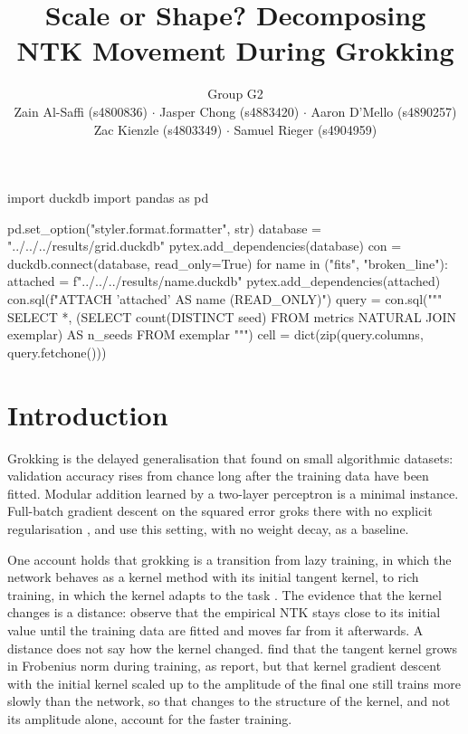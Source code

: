 \documentclass[a4paper,11pt]{article} %
\begin{document}
\begin{pycode}
import duckdb
import pandas as pd

pd.set_option("styler.format.formatter", str)
database = "../../../results/grid.duckdb"
pytex.add_dependencies(database)
con = duckdb.connect(database, read_only=True)
for name in ("fits", "broken_line"):
    attached = f"../../../results/{name}.duckdb"
    pytex.add_dependencies(attached)
    con.sql(f"ATTACH '{attached}' AS {name} (READ_ONLY)")
query = con.sql("""
    SELECT *,
        (SELECT count(DISTINCT seed) FROM metrics NATURAL JOIN exemplar) AS n_seeds
    FROM exemplar
""")
cell = dict(zip(query.columns, query.fetchone()))
\end{pycode}

\title{Scale or Shape? Decomposing NTK Movement During Grokking}
\author{Group G2 \\
  Zain Al-Saffi (s4800836) $\cdot$
  Jasper Chong (s4883420) $\cdot$
  Aaron D'Mello (s4890257) \\
Zac Kienzle (s4803349) $\cdot$ Samuel Rieger (s4904959)}

\date{}
\maketitle

\begin{abstract}
\end{abstract}

\section{Introduction}

Grokking is the delayed generalisation that
\citet{powerGrokkingGeneralizationOverfitting2022} found on small algorithmic
datasets: validation accuracy rises from chance long after the training data
have been fitted. Modular addition learned by a two-layer perceptron is a
minimal instance. Full-batch gradient descent on the squared error groks there
with no explicit regularisation \citep{gromovGrokkingModularArithmetic2023},
and \citet{kumarGrokkingTransitionLazy2024} use this setting, with no weight
decay, as a baseline.

One account holds that grokking is a transition from lazy training, in which
the network behaves as a kernel method with its initial tangent kernel, to rich
training, in which the kernel adapts to the task
\citep{kumarGrokkingTransitionLazy2024}. The evidence that the kernel changes
is a distance: \citet{mohamadiWhyYouGrok2024} observe that the empirical NTK
stays close to its initial value until the training data are fitted and moves
far from it afterwards. A distance does not say how the kernel changed.
\citet{shanTheoryNeuralTangent2022} find that the tangent kernel grows in
Frobenius norm during training, as
\citet{baratinImplicitRegularizationNeural2021} report, but that kernel
gradient descent with the initial kernel scaled up to
the amplitude of the final one still trains more slowly than the network, so
that changes to the structure of the kernel, and not its amplitude alone,
account for the faster training.
\end{document}
